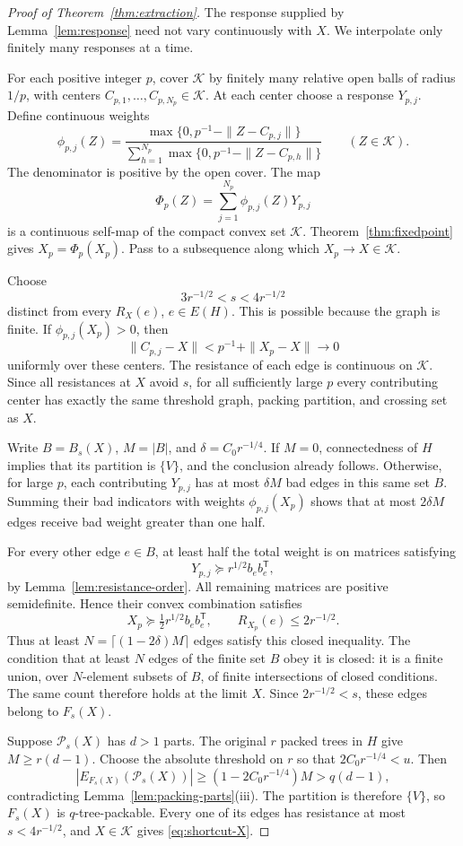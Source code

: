 \begin{proof}[Proof of Theorem~\ref{thm:extraction}]
The response supplied by Lemma~\ref{lem:response} need not vary
continuously with \(X\). We interpolate only finitely many responses
at a time.

For each positive integer \(p\), cover \(\mathcal K\) by finitely
many relative open balls of radius \(1/p\), with centers
\(C_{p,1},\ldots,C_{p,N_p}\in\mathcal K\). At each center choose a
response \(Y_{p,j}\). Define continuous weights
\[
 \phi_{p,j}(Z)=
 \frac{\max\{0,p^{-1}-\|Z-C_{p,j}\|\}}
 {\sum_{h=1}^{N_p}\max\{0,p^{-1}-\|Z-C_{p,h}\|\}}
 \qquad(Z\in\mathcal K).
\]
The denominator is positive by the open cover.
The map
\[
 \Phi_p(Z)=\sum_{j=1}^{N_p}\phi_{p,j}(Z)Y_{p,j}
\]
is a continuous self-map of the compact convex set \(\mathcal K\).
Theorem~\ref{thm:fixedpoint} gives
\(X_p=\Phi_p(X_p)\).
Pass to a subsequence along which \(X_p\to X\in\mathcal K\).

Choose
\[
 3r^{-1/2}<s<4r^{-1/2}
\]
distinct from every \(R_X(e)\), \(e\in E(H)\).
This is possible because the graph is finite.
If \(\phi_{p,j}(X_p)>0\), then
\[
 \|C_{p,j}-X\|<p^{-1}+\|X_p-X\|\longrightarrow0
\]
uniformly over these centers. The resistance of each edge is
continuous on \(\mathcal K\). Since all resistances at \(X\) avoid
\(s\), for all sufficiently large \(p\) every contributing center
has exactly the same threshold graph, packing partition, and
crossing set as \(X\).

Write \(B=B_s(X)\), \(M=|B|\), and
\(\delta=C_0r^{-1/4}\). If \(M=0\), connectedness of \(H\) implies
that its partition is \(\{V\}\), and the conclusion already follows.
Otherwise, for large \(p\), each contributing \(Y_{p,j}\) has at
most \(\delta M\) bad edges in this same set \(B\).
Summing their bad indicators with weights \(\phi_{p,j}(X_p)\)
shows that at most \(2\delta M\) edges receive bad weight greater
than one half.

For every other edge \(e\in B\), at least half the total weight is
on matrices satisfying
\[
 Y_{p,j}\succeq r^{1/2}b_eb_e^{\mathsf T},
\]
by Lemma~\ref{lem:resistance-order}. All remaining matrices are
positive semidefinite. Hence their convex combination satisfies
\[
 X_p\succeq\tfrac12r^{1/2}b_eb_e^{\mathsf T},
 \qquad R_{X_p}(e)\le2r^{-1/2}.
\]
Thus at least \(N=\lceil(1-2\delta)M\rceil\) edges satisfy this
closed inequality. The condition that at least \(N\) edges of the
finite set \(B\) obey it is closed: it is a finite union, over
\(N\)-element subsets of \(B\), of finite intersections of closed
conditions.
The same count therefore holds at the limit \(X\).
Since \(2r^{-1/2}<s\), these edges belong to \(F_s(X)\).

Suppose \(\mathcal P_s(X)\) has \(d>1\) parts.
The original \(r\) packed trees in \(H\) give \(M\ge r(d-1)\).
Choose the absolute threshold on \(r\) so that
\(2C_0r^{-1/4}<u\). Then
\[
 |E_{F_s(X)}(\mathcal P_s(X))|
 \ge(1-2C_0r^{-1/4})M
 >q(d-1),
\]
contradicting Lemma~\ref{lem:packing-parts}(iii).
The partition is therefore \(\{V\}\), so \(F_s(X)\) is
\(q\)-tree-packable. Every one of its edges has resistance at most
\(s<4r^{-1/2}\), and \(X\in\mathcal K\) gives
\eqref{eq:shortcut-X}.
\end{proof}

